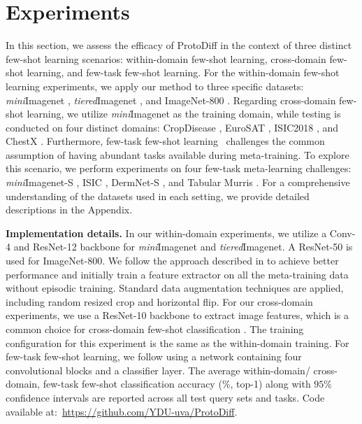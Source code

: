
\section{Experiments}

In this section, we assess the efficacy of ProtoDiff in the context of three distinct few-shot learning scenarios: within-domain few-shot learning, cross-domain few-shot learning, and few-task few-shot learning.
%
For the within-domain few-shot learning experiments, we apply our method to three specific datasets: \textit{mini}Imagenet \cite{vinyals2016matching}, \textit{tiered}Imagenet \cite{ren2018meta}, and ImageNet-800 \cite{chen2021meta}.
%
Regarding cross-domain few-shot learning, we utilize \textit{mini}Imagenet \cite{vinyals2016matching} as the training domain, while testing is conducted on four distinct domains: CropDisease \cite{mohanty2016}, EuroSAT \cite{helber2019eurosat}, ISIC2018 \cite{tschandl2018ham10000}, and ChestX \cite{wang2017chestx}.
%
Furthermore, few-task few-shot learning~\cite{yao2021meta} challenges the common assumption of having abundant tasks available during meta-training. To explore this scenario, we perform experiments on four few-task meta-learning challenges: \textit{mini}Imagenet-S \cite{vinyals2016matching}, ISIC \cite{milton2019automated}, DermNet-S \cite{Dermnetdataset}, and Tabular Murris \cite{cao2020concept}.
%
For a comprehensive understanding of the datasets used in each setting, we provide detailed descriptions in the Appendix.


\textbf{Implementation details.} 
In our within-domain experiments, we utilize a Conv-4 and ResNet-12 backbone for \textit{mini}Imagenet and \textit{tiered}Imagenet. A ResNet-50 is used for ImageNet-800. We follow the approach described in \cite{chen2021meta} to achieve better performance and initially train a feature extractor on all the meta-training data without episodic training.  Standard data augmentation techniques are applied, including random resized crop and horizontal flip. 
%
For our cross-domain experiments, we use a ResNet-10 backbone to extract image features, which is a common choice for cross-domain few-shot classification \cite{guo2020broader, ye20}. The training configuration for this experiment is the same as the within-domain training. 
%
For few-task few-shot learning, we follow \cite{yao2021meta} using a network containing four convolutional blocks and a classifier layer. The average within-domain/ cross-domain, few-task few-shot classification accuracy ($\%$, top-1) along with $95\%$ confidence intervals are reported across all test query sets and tasks. Code  available at:~\url{https://github.com/YDU-uva/ProtoDiff}.


